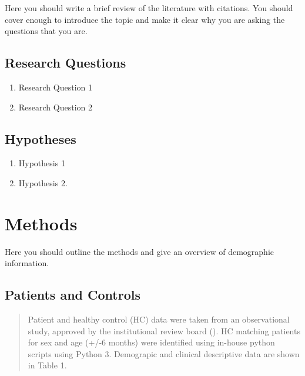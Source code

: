 \documentclass[11pt,]{article}
\providecommand{\tightlist}{%
\setlength{\itemsep}{0pt}\setlength{\parskip}{0pt}}
\begin{document}
Here you should write a brief review of the literature with citations.
You should cover enough to introduce the topic and make it clear why you
are asking the questions that you are.

\subsection{Research Questions}\label{research-questions}

\begin{enumerate}
\def\labelenumi{\arabic{enumi}.}
\tightlist
\item
  Research Question 1
\item
  Research Question 2
\end{enumerate}

\subsection{Hypotheses}\label{hypotheses}

\begin{enumerate}
\def\labelenumi{\arabic{enumi}.}
\tightlist
\item
  Hypothesis 1
\item
  Hypothesis 2.
\end{enumerate}

\section{Methods}\label{methods}

Here you should outline the methods and give an overview of demographic
information.

\subsection{Patients and Controls}\label{patients-and-controls}

\begin{quote}
Patient and healthy control (HC) data were taken from an observational
study, approved by the institutional review board (). HC matching
patients for sex and age (+/-6 months) were identified using in-house
python scripts using Python 3. Demograpic and clinical descriptive data
are shown in Table 1.
\end{quote}




\newpage
\singlespacing 

\end{document}
